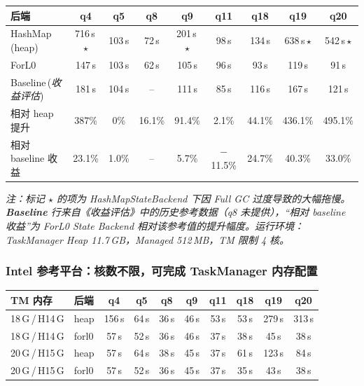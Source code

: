 \documentclass[a4paper,11pt]{article}
\newcommand{\project}{ForL0 State Backend}
\begin{document}
\begin{table}[H]
\centering
\footnotesize
\setlength{\tabcolsep}{4pt}
\begin{tabular}{@{}l cccccccc@{}}
\toprule
\textbf{后端} & \textbf{q4} & \textbf{q5} & \textbf{q8} & \textbf{q9} & \textbf{q11} & \textbf{q18} & \textbf{q19} & \textbf{q20} \\
\midrule
HashMap\,(heap)        & 716\,s\,$\star$ & 103\,s & 72\,s  & 201\,s\,$\star$ & 98\,s  & 134\,s & 638\,s\,$\star$ & 542\,s\,$\star$ \\
ForL0                  & 147\,s         & 103\,s & 62\,s  & 105\,s         & 96\,s  & 93\,s  & 119\,s         & 91\,s  \\
Baseline\,(\textit{收益评估})  & 181\,s         & 104\,s & --     & 111\,s         & 85\,s  & 116\,s & 167\,s         & 121\,s \\
\midrule
相对 heap 提升          & 387\% & 0\%    & 16.1\% & 91.4\%  & 2.1\%  & 44.1\% & 436.1\% & 495.1\% \\
相对 baseline 收益      & 23.1\% & 1.0\%  & --     & 5.7\%   & $-$11.5\% & 24.7\% & 40.3\% & 33.0\% \\
\bottomrule
\end{tabular}
\end{table}

\textit{注：标记 $\star$ 的项为 HashMapStateBackend 下因 Full GC 过度导致的大幅拖慢。\textbf{Baseline} 行来自《收益评估》中的历史参考数据（q8 未提供），“相对 baseline 收益”为 \project{} 相对该参考值的提升幅度。运行环境：TaskManager Heap 11.7\,GB，Managed 512\,MB，TM 限制 4 核。}

\subsubsection{Intel 参考平台：核数不限，可完成 TaskManager 内存配置}

\begin{table}[H]
\centering
\footnotesize
\setlength{\tabcolsep}{3.5pt}
\begin{tabular}{@{}ll cccccccc@{}}
\toprule
\textbf{TM 内存} & \textbf{后端} & \textbf{q4} & \textbf{q5} & \textbf{q8} & \textbf{q9} & \textbf{q11} & \textbf{q18} & \textbf{q19} & \textbf{q20} \\
\midrule
18\,G\,/\,H14\,G & heap  & 156\,s & 64\,s & 36\,s & 46\,s & 53\,s & 53\,s & 279\,s & 313\,s \\
18\,G\,/\,H14\,G & forl0 & 57\,s  & 52\,s & 36\,s & 46\,s & 37\,s & 38\,s & 45\,s  & 38\,s \\
\midrule
20\,G\,/\,H15\,G & heap  & 57\,s  & 64\,s & 38\,s & 45\,s & 37\,s & 61\,s & 123\,s & 84\,s \\
20\,G\,/\,H15\,G & forl0 & 57\,s  & 52\,s & 36\,s & 45\,s & 37\,s & 35\,s & 43\,s  & 38\,s \\
\bottomrule
\end{tabular}
\end{table}
\end{document}
